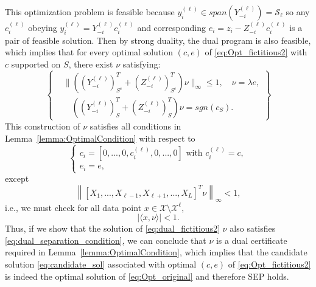 \documentclass[twoside,11pt]{article}
\numberwithin{equation}{section}
\begin{document}
This optimization problem is feasible because $y^{(\ell)}_i \in span(Y^{(\ell)}_{-i})=\mathcal{S}_{\ell}$ so any $c^{(\ell)}_i$ obeying $y^{(\ell)}_i=Y^{(\ell)}_{-i}c^{(\ell)}_i$ and corresponding $e_i = z_i - Z^{(\ell)}_{-i}c^{(\ell)}_i$ is a pair of feasible solution. Then by strong duality, the dual program is also feasible, which implies that for every optimal solution $(c, e)$ of \eqref{eq:Opt_fictitious2} with $c$ supported on $S$, there exist $\nu$ satisfying:
\begin{equation*}
\left\{
\begin{aligned}
    &\|((Y^{(\ell)}_{-i})_{S^{c}}^T +(Z^{(\ell)}_{-i})_{S^{c}}^T)\nu\|_{\infty}\leq 1, \quad \nu=\lambda e, \\
    &\quad((Y^{(\ell)}_{-i})_{S}^T +(Z^{(\ell)}_{-i})_{S}^T)\nu =sgn(c_S).
\end{aligned}
\right\}
\end{equation*}
This construction of $\nu$ satisfies all conditions in Lemma~\ref{lemma:OptimalCondition} with respect to
\begin{equation}\label{eq:candidate_sol}
\begin{cases}
    c_i= [0,...,0,c_i^{(\ell)},0,...,0]\text{ with }c_i^{(\ell)}=c,\\
    e_i= e,
\end{cases}
\end{equation}
except
\begin{equation*}
    \left\|[X_1,...,X_{\ell-1},X_{\ell+1},...,X_L]^T\nu\right\|_{\infty}<1,
\end{equation*}
i.e., we must check for all data point $x \in \mathcal{X}\setminus \mathcal{X}^{\ell}$,
\begin{equation}\label{eq:dual_separation_condition}
    |\langle x, \nu \rangle|< 1.
\end{equation}
Thus, if we show that the solution of \eqref{eq:dual_fictitious2} $\nu$ also satisfies \eqref{eq:dual_separation_condition}, we can conclude that $\nu$ is a dual certificate required in Lemma~\ref{lemma:OptimalCondition}, which implies that the candidate solution \eqref{eq:candidate_sol} associated with optimal $(c,e)$ of \eqref{eq:Opt_fictitious2} is indeed the optimal solution of \eqref{eq:Opt_original} and therefore SEP holds.



\end{document}
